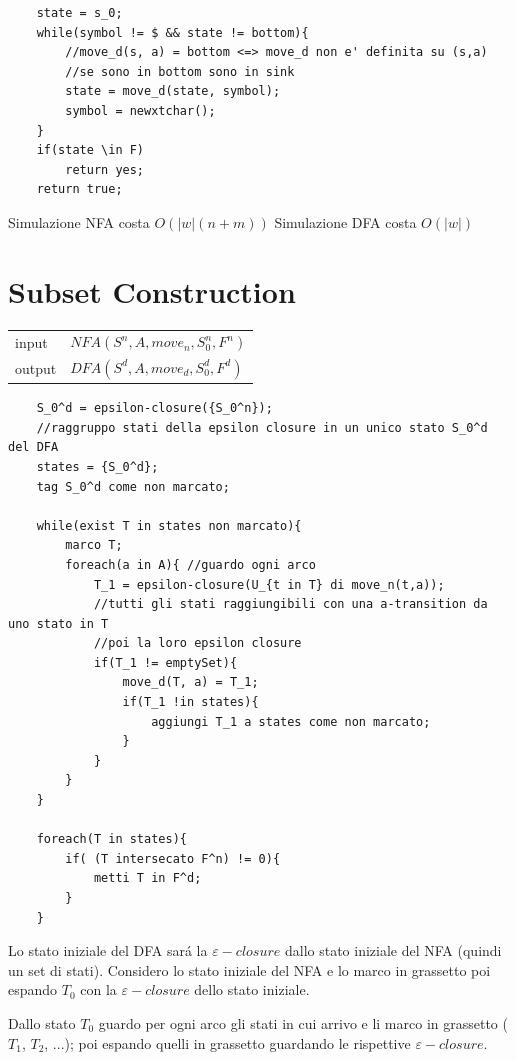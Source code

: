 \begin{lstlisting}
    state = s_0;
    while(symbol != $ && state != bottom){
        //move_d(s, a) = bottom <=> move_d non e' definita su (s,a)
        //se sono in bottom sono in sink
        state = move_d(state, symbol);
        symbol = newxtchar();
    }
    if(state \in F)
        return yes;
    return true;
\end{lstlisting}

Simulazione NFA costa $O(|w|(n+m))$
Simulazione DFA costa $O(|w|)$

\section{Subset Construction}
\begin{center}
    \begin{tabular}{ll}
        input & $NFA(S^n,A,move_n, S_0 ^n,F^n)$\\ 
        output & $DFA(S^d,A,move_d, S_0 ^d,F^d)$\\
    \end{tabular}
\end{center}

\begin{lstlisting}
	S_0^d = epsilon-closure({S_0^n});	
    //raggruppo stati della epsilon closure in un unico stato S_0^d del DFA
	states = {S_0^d};
	tag S_0^d come non marcato;

	while(exist T in states non marcato){
		marco T;
		foreach(a in A){ //guardo ogni arco
			T_1 = epsilon-closure(U_{t in T} di move_n(t,a));
            //tutti gli stati raggiungibili con una a-transition da uno stato in T 
            //poi la loro epsilon closure
			if(T_1 != emptySet){
				move_d(T, a) = T_1;
		 		if(T_1 !in states){
					aggiungi T_1 a states come non marcato;
				}
			}
		}
	}

	foreach(T in states){
		if( (T intersecato F^n) != 0){
			metti T in F^d;
		}
	}
\end{lstlisting}
Lo stato iniziale del DFA sar\'a la $\varepsilon - closure$ dallo stato iniziale del NFA (quindi un set di stati).
Considero lo stato iniziale del NFA e lo marco in grassetto poi espando $T_0$ con la $\varepsilon - closure$ dello stato iniziale. 

Dallo stato $T_0$ guardo per ogni arco gli stati in cui arrivo e li marco in grassetto ($T_1$, $T_2$, ...); 
poi espando quelli in grassetto guardando le rispettive $\varepsilon - closure$.

